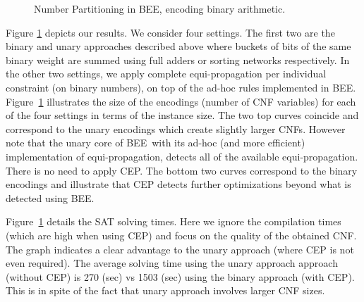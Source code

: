 \documentclass[runningheads,a4paper]{llncs}
\newcommand{\bee}{\textsf{BEE}}
\begin{document}
\begin{figure}
  \centering
  




\caption{Number Partitioning in \bee, encoding binary arithmetic.}
\label{fig:compareNumPartition}
\end{figure}
 
Figure \ref{fig:compareNumPartition} depicts our results. We consider
four settings. The first two are the binary and unary approaches
described above where buckets of bits of the same binary weight are
summed using full adders or sorting networks respectively. In the
other two settings, we apply complete equi-propagation per individual
constraint (on binary numbers), on top of the ad-hoc rules implemented
in \bee.
Figure~\ref{fig:compareNumPartition} illustrates the size
of the encodings (number of CNF variables) for each of the four
settings in terms of the instance size. The two top curves coincide
and correspond to the unary encodings which create slightly larger
CNFs. However note that the unary core of \bee\ with its ad-hoc (and
more efficient) implementation of equi-propagation, detects all of the
available equi-propagation. There is no need to apply CEP. The bottom
two curves correspond to the binary encodings and illustrate that CEP
detects further optimizations beyond what is detected using \bee.

Figure~\ref{fig:compareNumPartition} details the SAT
solving times. Here we ignore the compilation times (which are high
when using CEP) and focus on the quality of the obtained CNF. The
graph indicates a clear advantage to the unary approach (where CEP
is not even required).
The average solving time using the unary approach approach (without
CEP) is 270 (sec) vs 1503 (sec) using the binary approach (with
CEP). This is in spite of the fact that unary approach involves larger
CNF sizes.
\end{document}
